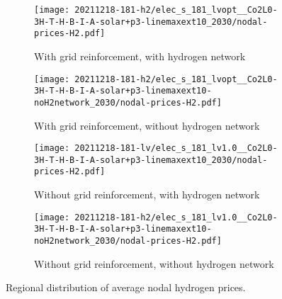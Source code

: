 \begin{figure}
    \begin{subfigure}{0.49\textwidth}
        \centering
        \caption{With grid reinforcement, with hydrogen network}
        \texttt{[image: 20211218-181-h2/elec\_s\_181\_lvopt\_\_Co2L0-3H-T-H-B-I-A-solar+p3-linemaxext10\_2030/nodal-prices-H2.pdf]}
    \end{subfigure}
    \begin{subfigure}{0.49\textwidth}
        \centering
        \caption{With grid reinforcement, without hydrogen network}
        \texttt{[image: 20211218-181-h2/elec\_s\_181\_lvopt\_\_Co2L0-3H-T-H-B-I-A-solar+p3-linemaxext10-noH2network\_2030/nodal-prices-H2.pdf]}
    \end{subfigure}
    \begin{subfigure}{0.49\textwidth}
        \centering
        \caption{Without grid reinforcement, with hydrogen network}
        \texttt{[image: 20211218-181-lv/elec\_s\_181\_lv1.0\_\_Co2L0-3H-T-H-B-I-A-solar+p3-linemaxext10\_2030/nodal-prices-H2.pdf]}
    \end{subfigure}
    \begin{subfigure}{0.49\textwidth}
        \centering
        \caption{Without grid reinforcement, without hydrogen network}
        \texttt{[image: 20211218-181-h2/elec\_s\_181\_lv1.0\_\_Co2L0-3H-T-H-B-I-A-solar+p3-linemaxext10-noH2network\_2030/nodal-prices-H2.pdf]}
    \end{subfigure}
    \caption{Regional distribution of average nodal hydrogen prices.}
    \label{fig:si:lmp-h2}
\end{figure}

